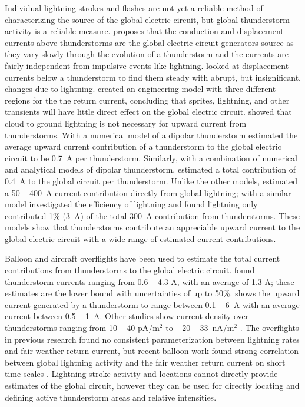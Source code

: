 Individual lightning strokes and flashes are not yet a reliable method of characterizing the source of the global electric circuit, but global thunderstorm activity is a reliable measure.
\citet{Ruhnke1969} proposes that the conduction and displacement currents above thunderstorms are the global electric circuit generators source as they vary slowly through the evolution of a thunderstorm and the currents are fairly independent from impulsive events like lightning.
\citet{Krider1985} looked at displacement currents below a thunderstorm to find them steady with abrupt, but insignificant, changes due to lightning.
\citet{Rycroft2000c} created an engineering model with three different regions for the the return current, concluding that sprites, lightning, and other transients will have little direct effect on the global electric circuit.
\citet{Stergis1957} showed that cloud to ground lightning is not necessary for upward current from thunderstorms.
With a numerical model of a dipolar thunderstorm \citet{Tzur1985} estimated the average upward current contribution of a thunderstorm to the global electric circuit to be 0.7~A per thunderstorm.
Similarly, with a combination of numerical and analytical models of dipolar thunderstorm, \citet{Driscoll1992} estimated a total contribution of 0.4~A to the global circuit per thunderstorm.
Unlike the other models, \citet{Mareev2008} estimated a 50 -- 400~A current contribution directly from global lightning;  with a similar model \citet{Mallios2012} investigated the efficiency of lightning and found lightning only contributed 1\% (3~A) of the total 300~A contribution from thunderstorms.
These models show that thunderstorms contribute an appreciable upward current to the global electric circuit with a wide range of estimated current contributions.

Balloon and aircraft overflights have been used to estimate the total current contributions from thunderstorms to the global electric circuit.
\citet{Stergis1957} found thunderstorm currents ranging from 0.6 -- 4.3 A, with an average of 1.3 A; these estimates are the lower bound with uncertainties of up to 50\%.
\citet{Blakeslee1989} shows the upward current generated by a thunderstorm to range between 0.1 -- 6~A with an average current between 0.5 -- 1~A.
Other studies show current density over thunderstorms ranging from 10 -- 40 pA/m$^2$ \citep{Holzworth1981} to $-20$ -- 33~nA/m$^2$ \citep{Mach2009}.
The overflights in previous research found no consistent parameterization between lightning rates and fair weather return current, but recent balloon work found strong correlation between global lightning activity and the fair weather return current on short time scales \citep{Holzworth2005}.
Lightning stroke activity and locations cannot directly provide estimates of the global circuit, however they can be used for directly locating and defining active thunderstorm areas and relative intensities.

